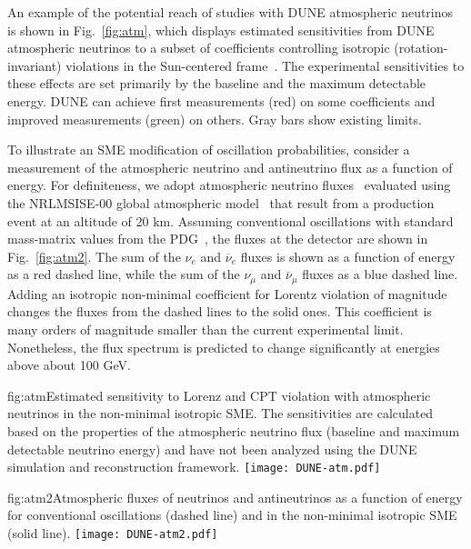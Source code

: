 An example of the potential reach of studies with DUNE atmospheric neutrinos
is shown in Fig.\ \ref{fig:atm},
which displays estimated sensitivities
from DUNE atmospheric neutrinos to a subset of coefficients 
controlling isotropic (rotation-invariant) violations 
in the Sun-centered frame~\cite{Kostelecky:2002hh}.
The experimental sensitivities to these effects
are set primarily by the baseline and the maximum detectable energy.
DUNE can achieve first measurements (red) on some coefficients
and improved measurements (green) on others.
Gray bars show existing limits.

To illustrate an SME modification of oscillation probabilities,
consider a measurement of the atmospheric neutrino and antineutrino flux
as a function of energy.
For definiteness,
we adopt atmospheric neutrino fluxes~\cite{Honda:2015fha}
evaluated using the NRLMSISE-00 global atmospheric model~\cite{Picone}
that result from a production event at an altitude of 20 km.
Assuming conventional oscillations with standard mass-matrix values from the PDG~\cite{Tanabashi:2018oca},
the fluxes at the detector are shown in Fig.\ \ref{fig:atm2}.
The sum of the $\nu_e$ and $\overline\nu_e$ fluxes
is shown as a function of energy as a red dashed line, 
while the sum of the $\nu_\mu$ and $\overline\nu_\mu$ fluxes 
as a blue dashed line. 
Adding an isotropic non-minimal coefficient for Lorentz violation
of magnitude %
changes the fluxes from the dashed lines to the solid ones.
This coefficient is many orders of magnitude smaller
than the current experimental limit.
Nonetheless,
the flux spectrum is predicted to change significantly 
at energies above about 100 GeV. 

\begin{dunefigure}{fig:atm}{Estimated sensitivity to Lorenz and CPT violation with atmospheric neutrinos in the non-minimal isotropic SME. The sensitivities are calculated based on the properties of the atmospheric neutrino flux (baseline and maximum detectable neutrino energy) and have not been analyzed using the DUNE simulation and reconstruction framework.}
\texttt{[image: DUNE-atm.pdf]}
\end{dunefigure}

\begin{dunefigure}{fig:atm2}{Atmospheric fluxes of neutrinos and antineutrinos as a function of energy for conventional oscillations (dashed line) and in the non-minimal isotropic SME (solid line).}
\texttt{[image: DUNE-atm2.pdf]}
\end{dunefigure}


